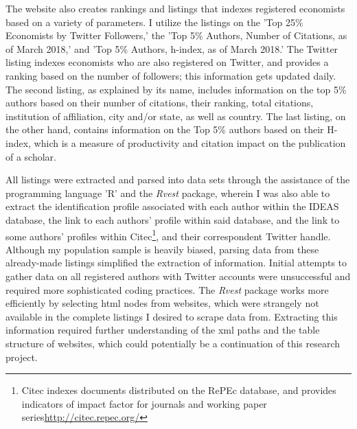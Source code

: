 \documentclass[12pt,english]{article}
\begin{document}
The website also creates rankings and listings that indexes registered economists based on a variety of parameters. I utilize the listings on the 'Top 25\% Economists by Twitter Followers,' the 'Top 5\% Authors, Number of Citations, as of March 2018,' and 'Top 5\% Authors, h-index, as of March 2018.' The Twitter listing indexes economists who are also registered on Twitter, and provides a ranking based on the number of followers; this information gets updated daily. The second listing, as explained by its name, includes information on the top 5\% authors based on their number of citations, their ranking,  total citations, institution of affiliation, city and/or state, as well as country. The last listing, on the other hand, contains information on the Top 5\% authors based on their H-index, which is a measure of productivity and citation impact on the publication of a scholar. 

All listings were extracted and parsed into data sets through the assistance of the programming language 'R' and the \textit{Rvest} package, wherein I was also able to extract the identification profile associated with each author within the IDEAS database, the link to each authors' profile within said database, and the link to some authors' profiles within Citec\footnote{Citec indexes documents distributed on the RePEc database, and provides indicators of impact factor for journals and working paper series\url{http://citec.repec.org/}}, and their correspondent Twitter handle. Although my population sample is heavily biased, parsing data from these already-made listings simplified the extraction of information. Initial attempts to gather data on all registered authors with Twitter accounts were unsuccessful and required more sophisticated coding practices. The \textit{Rvest} package works more efficiently by selecting html nodes from websites, which were strangely not available in the complete listings I desired to scrape data from. Extracting this information required further understanding of the xml paths and the table structure of websites, which could potentially be a continuation of this research project. 
\end{document}
